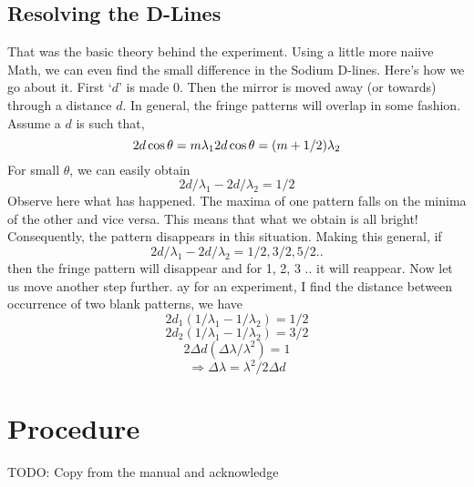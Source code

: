 	\subsection{Resolving the D-Lines}
		That was the basic theory behind the experiment. Using a little more naiive Math, we can even find the small difference in the Sodium D-lines. Here's how we go about it. First `$d$' is made 0. Then the mirror is moved away (or towards) through a distance $d$. In general, the fringe patterns will overlap in some fashion. Assume a $d$ is such that,
		\begin{equation}
			2d\cos{\theta}=m\lambda_1 \\
			2d\cos{\theta}=(m+1/2)\lambda_2
		\end{equation}
		For small $\theta$, we can easily obtain
		\begin{equation}
			2d/\lambda_1 - 2d/\lambda_2 = 1/2
		\end{equation}
		Observe here what has happened. The maxima of one pattern falls on the minima of the other and vice versa. This means that what we obtain is all bright! Consequently, the pattern disappears in this situation. Making this general, if
		\begin{equation}
			2d/\lambda_1 - 2d/\lambda_2 = 1/2, 3/2, 5/2 ..
		\end{equation}
		then the fringe pattern will disappear and for 1, 2, 3 .. it will reappear. Now let us move another step further. ay for an experiment, I find the distance between occurrence of two blank patterns, we have
		\begin{equation}
			2d_1 (1/\lambda_1 - 1/\lambda_2) = 1/2
		\end{equation}
		\begin{equation}
			2d_2 (1/\lambda_1 - 1/\lambda_2) = 3/2
		\end{equation}
		\begin{equation}
			2\Delta d (\Delta \lambda / \lambda^2) = 1
		\end{equation}
		\begin{equation}
			\Rightarrow \Delta \lambda = \lambda^2/2\Delta d
		\end{equation}

\section{Procedure}
	TODO: Copy from the manual and acknowledge

